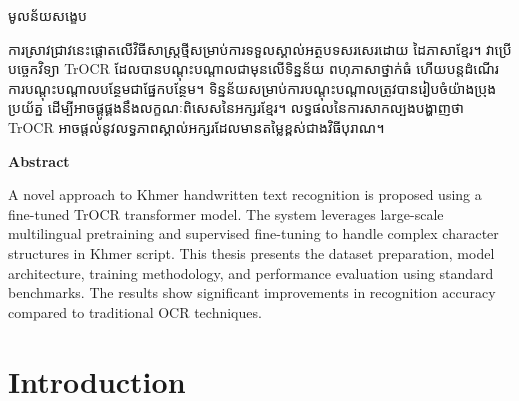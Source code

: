 \documentclass[12pt]{report}
\title{}
\author{}
\date{}
\begin{document}

\thispagestyle{empty}


\thispagestyle{plain}
\begin{center}
    {\khmerfont\fontsize{16pt}{20pt}\selectfont មូលន័យសង្ខេប \par}
    \vspace{1cm}
    \begin{minipage}{0.9\textwidth}
        \khmernormal
        \small
        ការស្រាវជ្រាវនេះផ្តោតលើវិធីសាស្ត្រថ្មីសម្រាប់ការទទួលស្គាល់អត្ថបទសរសេរដោយ ដៃភាសាខ្មែរ។ វាប្រើបច្ចេកវិទ្យា TrOCR ដែលបានបណ្ដុះបណ្ដាលជាមុនលើទិន្នន័យ ពហុភាសាថ្នាក់ធំ ហើយបន្តដំណើរការបណ្ដុះបណ្ដាលបន្ថែមជាផ្នែកបន្ថែម។ ទិន្នន័យសម្រាប់ការបណ្ដុះបណ្ដាលត្រូវបានរៀបចំយ៉ាងប្រុងប្រយ័ត្ន ដើម្បីអាចផ្គូផ្គងនឹងលក្ខណៈពិសេសនៃអក្សរខ្មែរ។ លទ្ធផលនៃការសាកល្បងបង្ហាញថា TrOCR អាចផ្ដល់នូវលទ្ធភាពស្គាល់អក្សរដែលមានតម្លៃខ្ពស់ជាងវិធីបុរាណ។
    \end{minipage}
\end{center}
\newpage

\thispagestyle{plain}
\begin{center}
    {\bfseries\LARGE Abstract \par}
    \vspace{1cm}
    \begin{minipage}{0.9\textwidth}
        \englishfont
        \small
        A novel approach to Khmer handwritten text recognition is proposed using a fine-tuned TrOCR transformer model. The system leverages large-scale multilingual pretraining and supervised fine-tuning to handle complex character structures in Khmer script. This thesis presents the dataset preparation, model architecture, training methodology, and performance evaluation using standard benchmarks. The results show significant improvements in recognition accuracy compared to traditional OCR techniques.
    \end{minipage}
\end{center}
\newpage

\tableofcontents
\newpage

\pagestyle{plain}

\chapter{Introduction}

\end{document}
